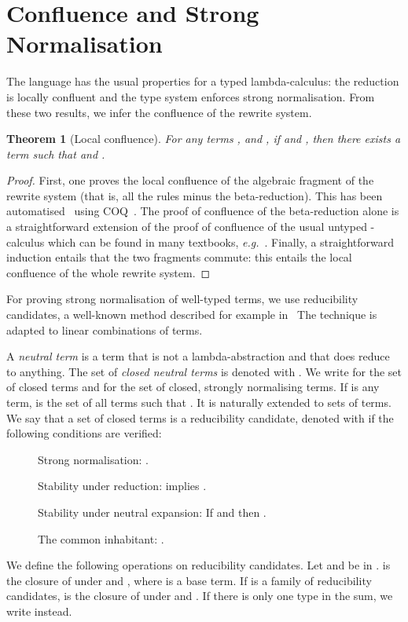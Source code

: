 \documentclass[colorlinks=true,linkcolor=black,urlcolor=black,citecolor=blue,submission,copyright,creativecommons]{eptcs}
\newtheorem{theorem}{Theorem}[section]
\newcommand{\eg}{\emph{e.g.}~}
\begin{document}
\section{Confluence and Strong Normalisation}\label{sec:conf}
 The language has the usual properties for a typed lambda-calculus: the reduction is locally confluent and the type system enforces strong normalisation. From these two results, we infer the confluence of the rewrite system.
 
\begin{theorem}[Local confluence]\label{thm:localconf}
   For any terms ,  and , if  and , then there exists a term  such that  and . 
\end{theorem}
\begin{proof}
   First, one proves the local confluence of the algebraic fragment of the rewrite system (that is, all the rules minus the beta-reduction). This has been automatised~\cite{BenCoqProof} using COQ~\cite{ManualCOQ}.
The proof of confluence of the beta-reduction alone is a
   straightforward extension of the proof of confluence of the usual
   untyped -calculus which can be found in many textbooks,
   \eg \cite[Sec. 1.3]{Krivine90}.
Finally, a straightforward induction entails that the two fragments commute: this entails the local confluence of the whole rewrite system.
\end{proof}

For proving strong normalisation of well-typed terms, we use reducibility candidates, a well-known method described for example in~\cite[Ch. 14]{GirardLafontTaylor89} The technique is adapted to linear combinations of terms. 
 
A {\em neutral term} is a term that is not a lambda-abstraction and
that does reduce to anything. The set of {\em closed neutral terms} is denoted with . We write  for the set of closed terms and  for the set of closed, strongly normalising terms. If  is any term,  is the set of all terms  such that .
It is naturally extended to sets of terms. We say that a set  of closed terms is a reducibility candidate, denoted with  if the following conditions are verified:
\begin{description}
 \item[] Strong normalisation: .
 \item[] Stability under reduction:  implies .
 \item[] Stability under neutral expansion: If  and  then .
 \item[] The common inhabitant: .
\end{description}
\noindent We define the following operations on reducibility
candidates. Let  and  be in .
 is the closure of  under  and
, where  is a base term. If  is a
family of reducibility candidates,  is
the closure of 
under  and . If there is only one type  in the sum, we
write  instead.
\end{document}
